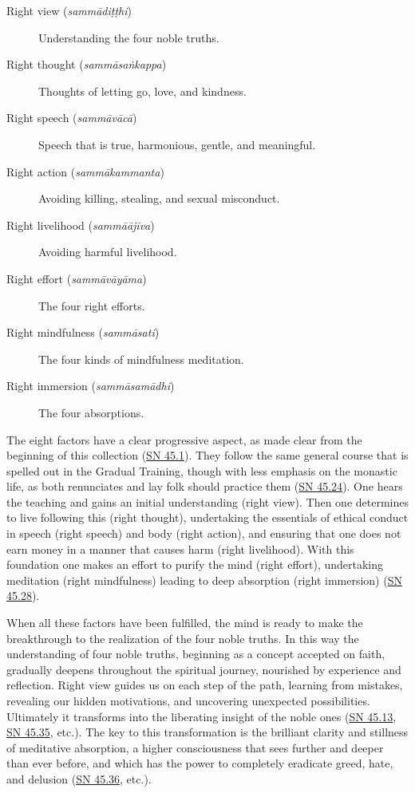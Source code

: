 \documentclass[12pt,openany]{book}%
\begin{document}
\begin{description}%
\item[Right view (\textit{\textsanskrit{sammādiṭṭhi}})] Understanding the four noble truths.%
\item[Right thought (\textit{\textsanskrit{sammāsaṅkappa}})] Thoughts of letting go, love, and kindness.%
\item[Right speech (\textit{\textsanskrit{sammāvācā}})] Speech that is true, harmonious, gentle, and meaningful.%
\item[Right action (\textit{\textsanskrit{sammākammanta}})] Avoiding killing, stealing, and sexual misconduct.%
\item[Right livelihood (\textit{\textsanskrit{sammāājīva}})] Avoiding harmful livelihood.%
\item[Right effort (\textit{\textsanskrit{sammāvāyāma}})] The four right efforts.%
\item[Right mindfulness (\textit{\textsanskrit{sammāsati}})] The four kinds of mindfulness meditation.%
\item[Right immersion (\textit{\textsanskrit{sammāsamādhi}})] The four absorptions.%
\end{description}

The eight factors have a clear progressive aspect, as made clear from the beginning of this collection (\href{https://suttacentral.net/sn45.1}{SN 45.1}). They follow the same general course that is spelled out in the Gradual Training, though with less emphasis on the monastic life, as both renunciates and lay folk should practice them (\href{https://suttacentral.net/sn45.24}{SN 45.24}). One hears the teaching and gains an initial understanding (right view). Then one determines to live following this (right thought), undertaking the essentials of ethical conduct in speech (right speech) and body (right action), and ensuring that one does not earn money in a manner that causes harm (right livelihood). With this foundation one makes an effort to purify the mind (right effort), undertaking meditation (right mindfulness) leading to deep absorption (right immersion) (\href{https://suttacentral.net/sn45.28}{SN 45.28}).

When all these factors have been fulfilled, the mind is ready to make the breakthrough to the realization of the four noble truths. In this way the understanding of four noble truths, beginning as a concept accepted on faith, gradually deepens throughout the spiritual journey, nourished by experience and reflection. Right view guides us on each step of the path, learning from mistakes, revealing our hidden motivations, and uncovering unexpected possibilities. Ultimately it transforms into the liberating insight of the noble ones (\href{https://suttacentral.net/sn45.13}{SN 45.13}, \href{https://suttacentral.net/sn45.35}{SN 45.35}, etc.). The key to this transformation is the brilliant clarity and stillness of meditative absorption, a higher consciousness that sees further and deeper than ever before, and which has the power to completely eradicate greed, hate, and delusion (\href{https://suttacentral.net/sn45.36}{SN 45.36}, etc.).
\end{document}
